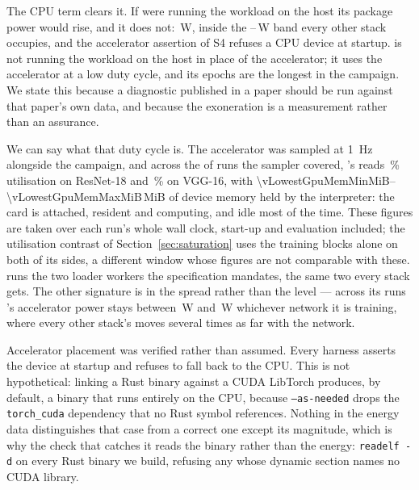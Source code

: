 The CPU term clears it. If \vLowestGpuEco{} were running the workload on the
host its package power would rise, and it does not:
\vLowestGpuEcoCpuW\,\si{\watt}, inside the
\vCpuPowerAcrossMinW--\vCpuPowerAcrossMaxW\,\si{\watt} band every other stack
occupies, and the accelerator assertion of S4 refuses a CPU device at startup.
\vLowestGpuEco{} is not running the workload on the host in place of the
accelerator; it uses the accelerator at a low duty cycle, and its epochs are the
longest in the campaign. We state this because a
diagnostic published in a paper should be run against that paper's own data, and
because the exoneration is a measurement rather than an assurance.

We can say what that duty cycle is. The accelerator was sampled at
\SI{1}{\hertz} alongside the campaign, and across the \vGpuUtilCoveredRuns{}
of \vRuns{} runs the sampler covered, \vLowestGpuEco{}'s reads
\vLowestGpuUtilResnetPct\,\% utilisation on ResNet-18 and
\vLowestGpuUtilVggPct\,\% on VGG-16, with
\num{\vLowestGpuMemMinMiB}--\num{\vLowestGpuMemMaxMiB}\,MiB of device memory
held by the \vLowestGpuEco{} interpreter: the card is attached, resident and
computing, and idle most of the time. These figures are taken over each run's
whole wall clock, start-up and evaluation included; the utilisation contrast of
Section~\ref{sec:saturation} uses the training blocks alone on both of its sides,
a different window whose figures are not comparable with these. \vLowestGpuEco{} runs the two loader
workers the specification mandates, the same two every stack gets. The other
signature is in the spread rather than the level --- across its runs
\vLowestGpuEco{}'s accelerator power stays between
\vLowestGpuRunMinW\,\si{\watt} and \vLowestGpuRunMaxW\,\si{\watt} whichever
network it is training, where every other stack's moves several times as far
with the network.

Accelerator placement was verified rather than assumed. Every harness asserts
the device at startup and refuses to fall back to the CPU. This is not
hypothetical: linking a Rust binary against a CUDA LibTorch produces, by default,
a binary that runs entirely on the CPU, because \texttt{--as-needed} drops the
\texttt{torch\_cuda} dependency that no Rust symbol references. Nothing in the
energy data distinguishes that case from a correct one except its magnitude,
which is why the check that catches it reads the binary rather than the energy:
\texttt{readelf -d} on every Rust binary we build, refusing any whose dynamic
section names no CUDA library.

